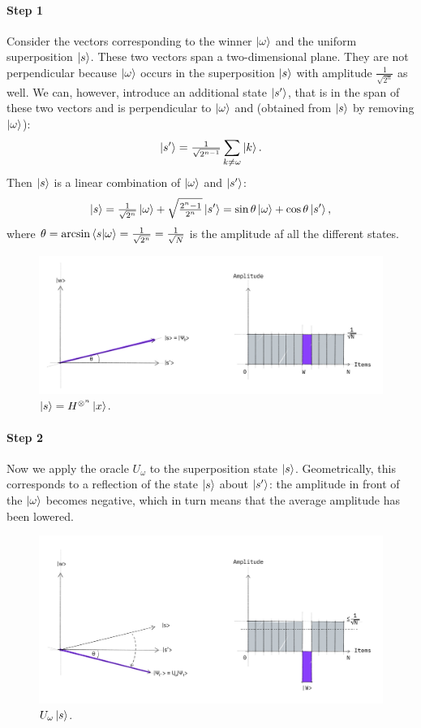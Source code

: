 \documentclass{article}
\begin{document}
\paragraph{Step 1}
Consider the vectors corresponding to the winner $\ket{\omega}$ and the
uniform superposition $\ket{s}$.
These two vectors span a two-dimensional plane.
They are not perpendicular because $\ket{\omega}$
occurs in the superposition $\ket{s}$ with amplitude $\frac{1}{\sqrt{2^n}}$
as well. We can, however, introduce an additional state $\ket{s'}$,
that is in the span of these two vectors and is perpendicular to
$\ket{\omega}$ and (obtained from $\ket{s}$ by removing $\ket{\omega}$):
\[
  \ket{s'} = \tfrac{1}{\sqrt{2^{n-1}}} \sum_{k \neq \omega} \ket{k}.
\]
Then $\ket{s}$ is a linear combination of $\ket{\omega}$ and $\ket{s'}$:
\[
  \ket{s} = \tfrac{1}{\sqrt{2^n}}  \ket{\omega} + \sqrt{\tfrac{2^n-1}{2^n}}
  \ket{s'} = \sin{\theta} \ket{\omega} + \cos{\theta} \ket{s'},
\]
where $\theta = \arcsin{\braket{s|\omega}} = \tfrac{1}{\sqrt{2^n}}
       = \tfrac{1}{\sqrt N}$ is the amplitude af all the different states.
\begin{figure}[H]
  \centering
  \includegraphics[width=345pt]{Img/grover-step1.jpg}
  \caption{$\ket{s} = H^{{\otimes}^n} \ket{x}$.}
\end{figure}

\paragraph{Step 2}
Now we apply the oracle $U_\omega$ to the superposition state
$\ket{s}$.
Geometrically, this corresponds to a reflection of the state $\ket{s}$
about $\ket{s'}$: the amplitude in front of the $\ket{\omega}$ becomes
negative, which in turn means that the average amplitude has been lowered.
\begin{figure}[H]
  \centering
  \includegraphics[width=345pt]{Img/grover-step2.jpg}
  \caption{$U_\omega \ket{s}$.}
\end{figure}
\end{document}
